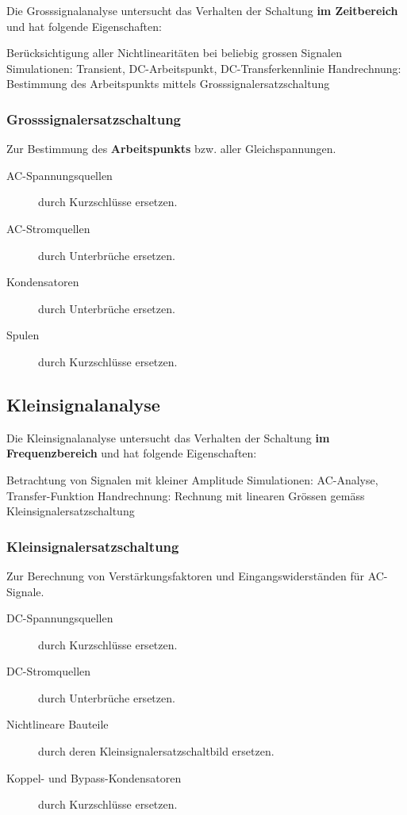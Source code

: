 Die Grosssignalanalyse untersucht das Verhalten der Schaltung \textbf{im Zeitbereich} und hat folgende Eigenschaften:

\smallskip

\begin{outline}
    \1 Berücksichtigung aller Nichtlinearitäten bei beliebig grossen Signalen
    \1 Simulationen: Transient, DC-Arbeitspunkt, DC-Transferkennlinie
    \1 Handrechnung: Bestimmung des Arbeitspunkts mittels Grosssignalersatzschaltung
\end{outline}


\subsubsection{Grosssignalersatzschaltung}
\label{Grosssignalersatzschaltung}

Zur Bestimmung des \textbf{Arbeitspunkts} bzw. aller Gleichspannungen.
\begin{description}
    \item[AC-Spannungsquellen] durch Kurzschlüsse ersetzen.
    \item[AC-Stromquellen] durch Unterbrüche ersetzen. 
    \item[Kondensatoren] durch Unterbrüche ersetzen.
    \item[Spulen] durch Kurzschlüsse ersetzen.  
\end{description}


\subsection{Kleinsignalanalyse}
\label{Kleinsignalanalyse}

Die Kleinsignalanalyse untersucht das Verhalten der Schaltung \textbf{im Frequenzbereich} und hat folgende Eigenschaften:

\smallskip

\begin{outline}
    \1 Betrachtung von Signalen mit kleiner Amplitude
    \1 Simulationen: AC-Analyse, Transfer-Funktion
    \1 Handrechnung: Rechnung mit linearen Grössen gemäss Kleinsignalersatzschaltung
\end{outline}


\subsubsection{Kleinsignalersatzschaltung}
\label{Kleinsignalersatzschaltung}
Zur Berechnung von Verstärkungsfaktoren und Eingangswiderständen für AC-Signale.

\begin{description}
    \item[DC-Spannungsquellen] durch Kurzschlüsse ersetzen.
    \item[DC-Stromquellen] durch Unterbrüche ersetzen. 
    \item[Nichtlineare Bauteile] durch deren Kleinsignalersatzschaltbild ersetzen.
    \item[Koppel- und Bypass-Kondensatoren] durch Kurzschlüsse ersetzen.  
\end{description}

